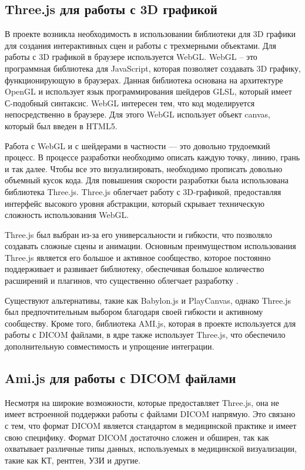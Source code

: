 \subsection{Three.js для работы с 3D графикой}
\label{subsec:three}
В проекте возникла необходимость в использовании библиотеки для 3D графики для создания интерактивных сцен и работы с трехмерными объектами. Для работы с 3D графикой в браузере используется WebGL. WebGL – это программная библиотека для JavaScript, которая позволяет создавать 3D графику, функционирующую в браузерах. Данная библиотека основана на архитектуре OpenGL и использует язык программирования шейдеров GLSL, который имеет С-подобный синтаксис. WebGL интересен тем, что код моделируется непосредственно в браузере. Для этого WebGL использует объект canvas, который был введен в HTML5.

Работа с WebGL и с шейдерами в частности — это довольно трудоемкий процесс. В процессе разработки необходимо описать каждую точку, линию, грань и так далее. Чтобы все это визуализировать, необходимо прописать довольно объемный кусок кода. Для повышения скорости разработки была использована библиотека Three.js. Three.js облегчает работу с 3D-графикой, предоставляя интерфейс высокого уровня абстракции, который скрывает техническую сложность использования WebGL.

Three.js был выбран из-за его универсальности и гибкости, что позволяло создавать сложные сцены и анимации. Основным преимуществом использования Three.js является его большое и активное сообщество, которое постоянно поддерживает и развивает библиотеку, обеспечивая большое количество расширений и плагинов, что существенно облегчает разработку \cite{dirksen2014three}. 

Существуют альтернативы, такие как Babylon.js и PlayCanvas, однако Three.js был предпочтительным выбором благодаря своей гибкости и активному сообществу. Кроме того, библиотека AMI.js, которая в проекте используется для работы с DICOM файлами, в ядре также использует Three.js, что обеспечило дополнительную совместимость и упрощение интеграции.

\subsection{Ami.js для работы с DICOM файлами}

Несмотря на широкие возможности, которые предоставляет Three.js, она не имеет встроенной поддержки работы с файлами DICOM напрямую. Это связано с тем, что формат DICOM является стандартом в медицинской практике и имеет свою специфику. Формат DICOM достаточно сложен и обширен, так как охватывает различные типы данных, используемых в медицинской визуализации, такие как КТ, рентген, УЗИ и другие.

